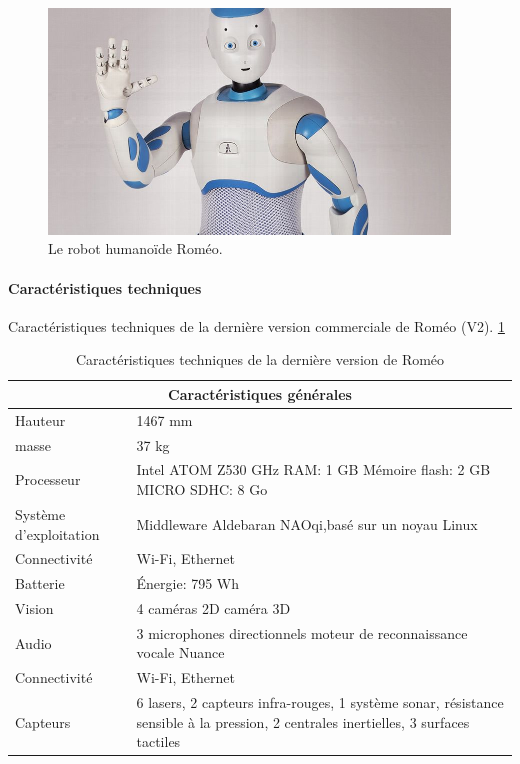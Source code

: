 \begin{figure}[h]
	\centering\includegraphics[height=6cm]{images/romeo.jpg}
	\caption{Le robot humanoïde Roméo.}
	\label{fig:Robot humanoïde Roméo}
\end{figure}

\paragraph{Caractéristiques techniques}
Caractéristiques techniques de la dernière version commerciale de Roméo (V2). \ref{tab: Caractéristiques technique de Roméo}

\begin{table}[h]
	\begin{tabular}{ | l | p{10cm} | }
		\hline
		\multicolumn{2}{|c|}{Caractéristiques générales} \\
		\hline
		Hauteur & 1467 mm \\
		\hline 
		masse & 37 kg \\
		\hline
		Processeur & Intel ATOM Z530 \newline 1.6 GHz \newline RAM: 1 GB \newline Mémoire flash: 2 GB \newline MICRO SDHC: 8 Go  \\
		\hline
		Système d'exploitation & Middleware Aldebaran NAOqi,\newline basé sur un noyau Linux \\
		\hline
		Connectivité & Wi-Fi, Ethernet \\
		\hline
		Batterie & Énergie: 795 Wh \\
		\hline 
		Vision & 4 caméras 2D \newline 1 caméra 3D \\
		\hline
		Audio & 3 microphones directionnels \newline moteur de reconnaissance vocale Nuance  \\
		\hline
		Connectivité & Wi-Fi, Ethernet \\
		\hline
		Capteurs & 6 lasers, 2 capteurs infra-rouges, 1 système sonar, résistance sensible à la pression, 2 centrales inertielles, 3 surfaces tactiles \\
		\hline
	\end{tabular}
	\caption[Caractéristiques technique de Roméo]{Caractéristiques techniques de la dernière version de Roméo}
	\label {tab: Caractéristiques technique de Roméo}
	\cite{RomeoTech}
\end{table}

